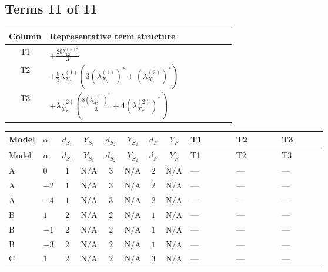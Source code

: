 \documentclass[8pt]{article}
\begin{document}
\begin{landscape}
\subsection*{Terms 11 of 11}
\begin{center}
\begin{tabular}{@{}c >{\raggedright\arraybackslash}p{0.82\linewidth}@{}}
\toprule
Column & Representative term structure \\
\midrule
T1 & \(\displaystyle +\frac{20 {\lambda_{12}^{(\times)}}^2}{3}\) \\
\midrule
T2 & \(\displaystyle +\frac{8}{3} {\lambda_{X_{7}}^{(1)}} (3 \left({\lambda_{X_{7}}^{(1)}}\right)^{*}+\left({\lambda_{X_{7}}^{(2)}}\right)^{*})\) \\
\midrule
T3 & \(\displaystyle +{\lambda_{X_{7}}^{(2)}} \left(\frac{8 \left({\lambda_{X_{7}}^{(1)}}\right)^{*}}{3}+4 \left({\lambda_{X_{7}}^{(2)}}\right)^{*}\right)\) \\
\midrule
\bottomrule
\end{tabular}
\end{center}
\smallskip
\tiny
\begin{longtable}{@{}llcccccc >{\raggedright\arraybackslash}p{0.21\linewidth} >{\raggedright\arraybackslash}p{0.21\linewidth} >{\raggedright\arraybackslash}p{0.21\linewidth}@{}}
\toprule
Model & $\alpha$ & $d_{S_1}$ & $Y_{S_1}$ & $d_{S_2}$ & $Y_{S_2}$ & $d_F$ & $Y_F$ & T1 & T2 & T3 \\
\midrule
\endfirsthead
\toprule
Model & $\alpha$ & $d_{S_1}$ & $Y_{S_1}$ & $d_{S_2}$ & $Y_{S_2}$ & $d_F$ & $Y_F$ & T1 & T2 & T3 \\
\midrule
\endhead
A & $0$ & $1$ & $\text{N/A}$ & $3$ & $\text{N/A}$ & $2$ & $\text{N/A}$ & --- & --- & --- \\
\midrule
A & $-2$ & $1$ & $\text{N/A}$ & $3$ & $\text{N/A}$ & $2$ & $\text{N/A}$ & --- & --- & --- \\
\midrule
A & $-4$ & $1$ & $\text{N/A}$ & $3$ & $\text{N/A}$ & $2$ & $\text{N/A}$ & --- & --- & --- \\
\midrule
B & $1$ & $2$ & $\text{N/A}$ & $2$ & $\text{N/A}$ & $1$ & $\text{N/A}$ & --- & --- & --- \\
\midrule
B & $-1$ & $2$ & $\text{N/A}$ & $2$ & $\text{N/A}$ & $1$ & $\text{N/A}$ & --- & --- & --- \\
\midrule
B & $-3$ & $2$ & $\text{N/A}$ & $2$ & $\text{N/A}$ & $1$ & $\text{N/A}$ & --- & --- & --- \\
\midrule
C & $1$ & $2$ & $\text{N/A}$ & $2$ & $\text{N/A}$ & $3$ & $\text{N/A}$ & --- & --- & --- \\

\end{longtable}
\end{landscape}
\end{document}
